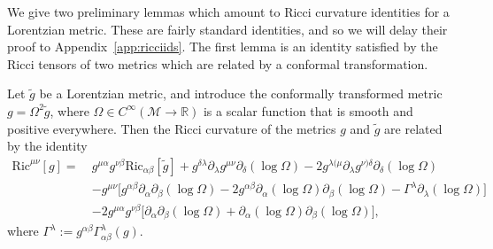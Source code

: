 \documentclass{article}
\newcommand{\RR}{\mathbb{R}}
\newcommand{\Ric}{\mathrm{Ric}}
\newcommand{\mc}{\mathcal}
\newcommand{\wt}{\widetilde}
\newcommand{\pa}{\partial}
\newcommand{\ra}{\rightarrow}
\begin{document}
We give two preliminary lemmas which amount to Ricci curvature identities for a Lorentzian metric. These are fairly standard identities, and so we will delay their proof to Appendix~\ref{app:ricciids}. The first lemma is an identity satisfied by the Ricci tensors of two metrics which are related by a conformal transformation.
\begin{lemma}\label{sec:gaugedeqs.lem:ricciconformal}
    Let $\wt{g}$ be a Lorentzian metric, and introduce the conformally transformed metric $g = \Omega^2\wt{g}$, where $\Omega\in C^\infty(\mc{M}\ra \RR)$ is a scalar function that is smooth and positive everywhere. Then the Ricci curvature of the metrics $g$ and $\wt{g}$ are related by the identity
    \begin{align}
        \Ric^{\mu\nu}[g] =\>&g^{\mu\alpha}g^{\nu\beta}\Ric_{\alpha\beta}[\wt{g}] + g^{\delta\lambda}\pa_\lambda g^{\mu\nu} \pa_\delta (\log \Omega) - 2g^{\lambda(\mu}\pa_\lambda g^{\nu)\delta}\pa_\delta (\log \Omega) \nonumber\\
        &- g^{\mu\nu} \Big[g^{\alpha\beta}\pa_\alpha \pa_\beta (\log\Omega) - 2g^{\alpha\beta}\pa_\alpha (\log \Omega) \pa_\beta (\log \Omega) - \Gamma^\lambda \pa_\lambda (\log \Omega)\Big]\nonumber\\
        &-2g^{\mu\alpha}g^{\nu\beta}\Big[\pa_\alpha\pa_\beta(\log \Omega) + \pa_\alpha (\log \Omega)\pa_\beta (\log \Omega)\Big],\label{sec:gaugedeqs.eq:ricciconformal}
    \end{align}
    where $\Gamma^\lambda:= g^{\alpha\beta}\Gamma_{\alpha\beta}^\lambda(g)$.
\end{lemma}
\end{document}
